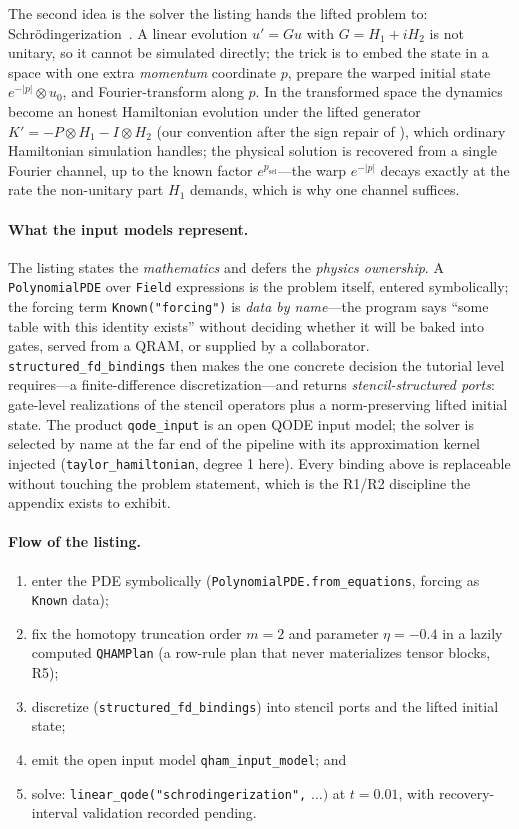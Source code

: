 The second idea is the solver the listing hands the lifted problem to:
Schr\"odingerization~\cite{jin2024schrodingerization,hu2024schrocircuits}.
A linear evolution $u'=Gu$ with $G=H_1+iH_2$ is not unitary, so it cannot
be simulated directly; the trick is to embed the state in a space with
one extra \emph{momentum} coordinate $p$, prepare the warped initial
state $e^{-|p|}\otimes u_0$, and Fourier-transform along $p$.  In the
transformed space the dynamics become an honest Hamiltonian evolution
under the lifted generator $K'=-P\otimes H_1 - I\otimes H_2$ (our
convention after the sign repair of ), which
ordinary Hamiltonian simulation handles; the physical solution is
recovered from a single Fourier channel, up to the known factor
$e^{p_{\mathrm{sel}}}$---the warp $e^{-|p|}$ decays exactly at the rate
the non-unitary part $H_1$ demands, which is why one channel suffices.

\paragraph{What the input models represent.}
The listing states the \emph{mathematics} and defers the \emph{physics
ownership}.  A \texttt{PolynomialPDE} over \texttt{Field} expressions is
the problem itself, entered symbolically; the forcing term
\texttt{Known("forcing")} is \emph{data by name}---the program says
``some table with this identity exists'' without deciding whether it will
be baked into gates, served from a QRAM, or supplied by a collaborator.
\texttt{structured\_fd\_bindings} then makes the one concrete decision
the tutorial level requires---a finite-difference discretization---and
returns \emph{stencil-structured ports}: gate-level realizations of the
stencil operators plus a norm-preserving lifted initial state.  The
product \texttt{qode\_input} is an open QODE input model; the solver is
selected by name at the far end of the pipeline with its approximation
kernel injected (\texttt{taylor\_hamiltonian}, degree 1 here).  Every
binding above is replaceable without touching the problem statement,
which is the R1/R2 discipline the appendix exists to exhibit.

\paragraph{Flow of the listing.}
\begin{enumerate}
\item enter the PDE symbolically (\texttt{PolynomialPDE.from\_equations},
  forcing as \texttt{Known} data);
\item fix the homotopy truncation order $m{=}2$ and parameter
  $\eta{=}{-}0.4$ in a lazily computed \texttt{QHAMPlan} (a row-rule plan
  that never materializes tensor blocks, R5);
\item discretize (\texttt{structured\_fd\_bindings}) into stencil ports
  and the lifted initial state;
\item emit the open input model \texttt{qham\_input\_model}; and
\item solve: \texttt{linear\_qode("schrodingerization",} $\ldots)$ at
  $t=0.01$, with recovery-interval validation recorded pending.
\end{enumerate}

